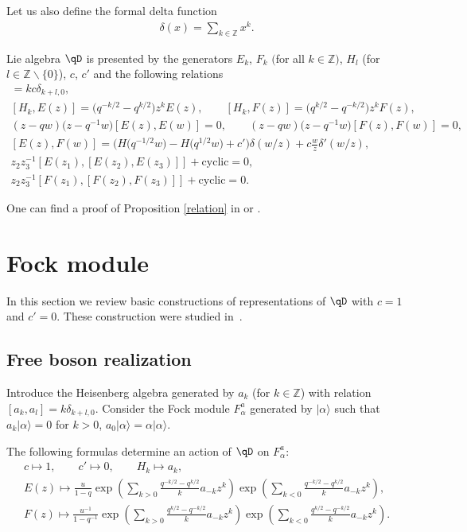 Let us also define the formal delta function
\begin{gather*}
\delta(x) = \sum_{k \in \mathbb{Z}} x^k.
\end{gather*}
\begin{Proposition}\label{relation} Lie algebra $\qD$ is presented by the generators $E_k$, $F_k$ $($for all $k \in \mathbb{Z})$, $H_l$ {\upshape(}for $l \in \mathbb{Z} \backslash \{0 \}${\upshape)}, $c$, $c'$ and the following relations
\begin{gather}
[H_k, H_l] = k c \delta_{k+l, 0}, \label{RqDHH} \\
[H_k , E(z)] = \big(q^{-k/2}-q^{k/2}\big)z^k E(z), \qquad
[H_k, F(z)]= \big(q^{k/2}-q^{-k/2}\big) z^k F(z), \label{RqDHE-F} \\
(z-qw)\big(z-q^{-1} w\big) [E(z), E(w)]= 0, \qquad
(z-qw)\big(z-q^{-1} w\big) [F(z), F(w)]= 0 , \label{RqDE2} \\
[ E (z) , F (w)] = \big( H\big( q^{-1/2} w \big) - H\big(q^{1/2} w\big) + c'\big) \delta( w / z ) + c \frac{w}{z} \delta'(w/ z),\label{RqDEF} \\
z_2 z_3^{-1} [E(z_1), [E(z_2), E(z_3)]] + \mathrm{cyclic} =0, \label{RqDEEE} \\
z_2 z_3^{-1} [F(z_1), [F(z_2), F(z_3)]] + \mathrm{cyclic} =0. \label{RqDFFF}
\end{gather}
\end{Proposition}
One can find a proof of Proposition \ref{relation} in \cite[Theorem~2.1]{M07} or \cite[Theorem~5.5]{Ts}.

\section{Fock module} \label{level1}
In this section we review basic constructions of representations of $\qD$ with $c=1$ and $c'=0$. These construction were studied in~\cite{GL}.

\subsection{Free boson realization} \label{boson}

Introduce the Heisenberg algebra generated by $a_k$ (for $k \in \mathbb{Z}$) with relation $[a_k, a_l] = k \delta_{k+l, 0}$. Consider the Fock module $F_{\alpha}^a$ generated by $| \alpha \rangle$ such that $a_k | \alpha \rangle = 0$ for $k > 0$, $a_0 | \alpha \rangle = \alpha | \alpha \rangle$.
\begin{Proposition} \label{prop:sec3 Boson Fock}
The following formulas
determine an action of $\qD$ on $F_{\alpha}^a$:
\begin{gather}
c \mapsto 1, \qquad c' \mapsto 0, \qquad H_k \mapsto a_k, \label{boson1}\\
E(z) \mapsto \frac{u}{1-q} \exp \left( \sum_{k>0} \frac{q^{-k/2}-q^{k/2}}{k} a_{-k} z^k \right) \exp \left( \sum_{k<0} \frac{q^{-k/2}-q^{k/2}}{k} a_{-k} z^k \right) \label{eq:E},\\
F(z) \mapsto \frac{u^{-1}}{1-q^{-1}} \exp \left( \sum_{k>0} \frac{q^{k/2}-q^{-k/2}}{k} a_{-k} z^k \right) \exp \left( \sum_{k<0}\frac{q^{k/2}-q^{-k/2}}{k} a_{-k} z^k \right). \label{eq:F}
\end{gather}
\end{Proposition}

